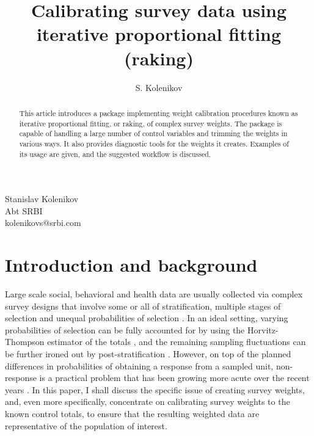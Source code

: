 \author{S. Kolenikov}{%
  Stanislav Kolenikov\\Abt SRBI\\kolenikovs@srbi.com
}
\title[Raking survey data]{Calibrating survey data using iterative proportional fitting (raking)}
\maketitle

\begin{abstract}
This article introduces a package implementing weight calibration
procedures known as iterative proportional fitting,
or raking, of complex survey weights.
The package is capable of handling a large number of control
variables and trimming the weights in various ways.
It also provides diagnostic tools for the weights it creates.
Examples of its usage are given,
and the suggested workflow is discussed.

\end{abstract}

\section{Introduction and background}

Large scale social, behavioral and health data are usually collected
via complex survey designs that involve some or all of stratification,
multiple stages of selection and unequal probabilities of selection
\citep{korn:graubard:1995,korn:graubard:1999}.
In an ideal setting, varying probabilities of selection can be fully
accounted for by using the Horvitz-Thompson estimator of the totals
\citep{horvitz:thompson:1952,thompson:1997}, and the remaining
sampling fluctuations can be further ironed out by
post-stratification \citep{holt:smith:1979}.
However, on top of the planned differences in probabilities of obtaining
a response from a sampled unit, non-response is a practical problem
that has been growing more acute over the recent years
\citep{groves:dillman:eltinge:little:2001,pew:2012}.
In this paper, I shall discuss the specific issue of creating
survey weights, and, even more specifically, concentrate on
calibrating survey weights to the known control totals, to ensure
that the resulting weighted data are representative of the population
of interest.

